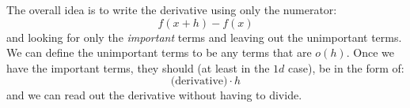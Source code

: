 \begin{itemize}
\begin{idea}
        The overall idea is to write the derivative using only the numerator:
        \begin{equation}
            f(x+h)-f(x)
        \end{equation}
        and looking for only the \textit{important} terms and leaving out the unimportant terms. We can define the unimportant terms to be any terms that are $o(h)$. Once we have the important terms, they should (at least in the $1d$ case), be in the form of:
        \begin{equation}
            \text{(derivative)} \cdot h
        \end{equation}
        and we can read out the derivative without having to divide.
    \end{idea}
\end{itemize}